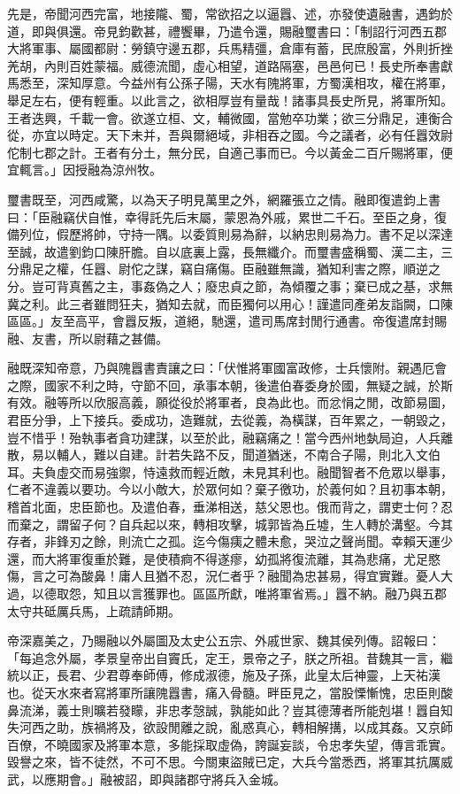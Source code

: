 \begin{pinyinscope}
先是，帝聞河西完富，地接隴、蜀，常欲招之以逼囂、述，亦發使遺融書，遇鈞於道，即與俱還。帝見鈞歡甚，禮饗畢，乃遣令還，賜融璽書曰：「制詔行河西五郡大將軍事、屬國都尉：勞鎮守邊五郡，兵馬精彊，倉庫有蓄，民庶殷富，外則折挫羌胡，內則百姓蒙福。威德流聞，虛心相望，道路隔塞，邑邑何已！長史所奉書獻馬悉至，深知厚意。今益州有公孫子陽，天水有隗將軍，方蜀漢相攻，權在將軍，舉足左右，便有輕重。以此言之，欲相厚豈有量哉！諸事具長史所見，將軍所知。王者迭興，千載一會。欲遂立桓、文，輔微國，當勉卒功業；欲三分鼎足，連衡合從，亦宜以時定。天下未并，吾與爾絕域，非相吞之國。今之議者，必有任囂效尉佗制七郡之計。王者有分土，無分民，自適己事而已。今以黃金二百斤賜將軍，便宜輒言。」因授融為涼州牧。

璽書既至，河西咸驚，以為天子明見萬里之外，網羅張立之情。融即復遣鈞上書曰：「臣融竊伏自惟，幸得託先后末屬，蒙恩為外戚，累世二千石。至臣之身，復備列位，假歷將帥，守持一隅。以委質則易為辭，以納忠則易為力。書不足以深達至誠，故遣劉鈞口陳肝膽。自以底裏上露，長無纖介。而璽書盛稱蜀、漢二主，三分鼎足之權，任囂、尉佗之謀，竊自痛傷。臣融雖無識，猶知利害之際，順逆之分。豈可背真舊之主，事姦偽之人；廢忠貞之節，為傾覆之事；棄已成之基，求無冀之利。此三者雖問狂夫，猶知去就，而臣獨何以用心！謹遣同產弟友詣闕，口陳區區。」友至高平，會囂反叛，道絕，馳還，遣司馬席封閒行通書。帝復遣席封賜融、友書，所以尉藉之甚備。

融既深知帝意，乃與隗囂書責讓之曰：「伏惟將軍國富政修，士兵懷附。親遇厄會之際，國家不利之時，守節不回，承事本朝，後遣伯春委身於國，無疑之誠，於斯有效。融等所以欣服高義，願從役於將軍者，良為此也。而忿悁之閒，改節易圖，君臣分爭，上下接兵。委成功，造難就，去從義，為橫謀，百年累之，一朝毀之，豈不惜乎！殆執事者貪功建謀，以至於此，融竊痛之！當今西州地埶局迫，人兵離散，易以輔人，難以自建。計若失路不反，聞道猶迷，不南合子陽，則北入文伯耳。夫負虛交而易強禦，恃遠救而輕近敵，未見其利也。融聞智者不危眾以舉事，仁者不違義以要功。今以小敵大，於眾何如？棄子徼功，於義何如？且初事本朝，稽首北面，忠臣節也。及遣伯春，垂涕相送，慈父恩也。俄而背之，謂吏士何？忍而棄之，謂留子何？自兵起以來，轉相攻擊，城郭皆為丘墟，生人轉於溝壑。今其存者，非鋒刃之餘，則流亡之孤。迄今傷痍之體未愈，哭泣之聲尚聞。幸賴天運少還，而大將軍復重於難，是使積痾不得遂瘳，幼孤將復流離，其為悲痛，尤足愍傷，言之可為酸鼻！庸人且猶不忍，況仁者乎？融聞為忠甚易，得宜實難。憂人大過，以德取怨，知且以言獲罪也。區區所獻，唯將軍省焉。」囂不納。融乃與五郡太守共砥厲兵馬，上疏請師期。

帝深嘉美之，乃賜融以外屬圖及太史公五宗、外戚世家、魏其侯列傳。詔報曰：「每追念外屬，孝景皇帝出自竇氏，定王，景帝之子，朕之所祖。昔魏其一言，繼統以正，長君、少君尊奉師傅，修成淑德，施及子孫，此皇太后神靈，上天祐漢也。從天水來者寫將軍所讓隗囂書，痛入骨髓。畔臣見之，當股慄慚愧，忠臣則酸鼻流涕，義士則曠若發矇，非忠孝愨誠，孰能如此？豈其德薄者所能剋堪！囂自知失河西之助，族禍將及，欲設閒離之說，亂惑真心，轉相解搆，以成其姦。又京師百僚，不曉國家及將軍本意，多能採取虛偽，誇誕妄談，令忠孝失望，傳言乖實。毀譽之來，皆不徒然，不可不思。今關東盜賊已定，大兵今當悉西，將軍其抗厲威武，以應期會。」融被詔，即與諸郡守將兵入金城。


\end{pinyinscope}
